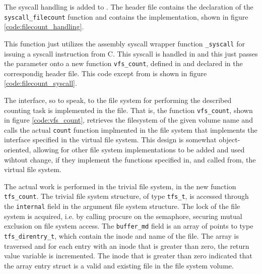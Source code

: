 The syscall handling is added to . The header file
contains the declaration of the \verb|syscall_filecount| function and
 contains the implementation, shown in figure
\ref{code:filecount_handling}.


This function just utilizes the assembly syscall wrapper function
\verb|_syscall| for issuing a syscall instruction from C. This syscall is
handled in  and this just passes the parameter onto a new
function \verb|vfs_count|, defined in  and declared in the
correspondig header file. This code except from  is shown
in figure \ref{code:filecount_syscall}.


The interface, so to speak, to the file system for performing the described
counting task is implemented in the  file. That is, the function
\verb|vfs_count|, shown in figure \ref{code:vfs_count}, retrieves the
filesystem of the given volume name and calls the actual \verb|count| function
implmented in the file system that implements the interface specified in the
virtual file system. This design is somewhat object-oriented, allowing for
other file system implementations to be added and used wihtout change, if they
implement the functions specified in, and called from, the virtual file system.


The actual work is performed in the trivial file system, in the new function
\verb|tfs_count|. The trivial file system structure, of type \verb|tfs_t|, is
accessed through the \verb|internal| field in the argument file system
structure. The lock of the file system is acquired, i.e. by calling procure on
the semaphore, securing mutual exclusion on file system access. The
\verb|buffer_md| field is an array of points to type \verb|tfs_direntry_t|,
which contain the inode and name of the file. The array is traversed and for
each entry with an inode that is greater than zero, the return value variable
is incremented. The inode that is greater than zero indicated that the array
entry struct is a valid and existing file in the file system volume.


